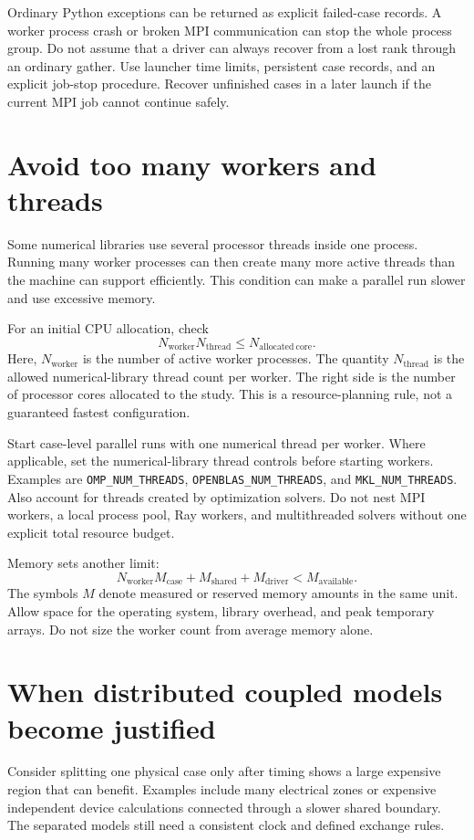 \documentclass[11pt,a4paper]{report}
\begin{document}
Ordinary Python exceptions can be returned as explicit failed-case records.
A worker process crash or broken MPI communication can stop the whole process group.
Do not assume that a driver can always recover from a lost rank through an ordinary gather.
Use launcher time limits, persistent case records, and an explicit job-stop procedure.
Recover unfinished cases in a later launch if the current MPI job cannot continue safely.

\section{Avoid too many workers and threads}
Some numerical libraries use several processor threads inside one process.
Running many worker processes can then create many more active threads than the machine can support efficiently.
This condition can make a parallel run slower and use excessive memory.

For an initial CPU allocation, check
\begin{equation}
N_{\mathrm{worker}}N_{\mathrm{thread}}
\leq N_{\mathrm{allocated\ core}}.
\label{eq:worker-budget}
\end{equation}
Here, $N_{\mathrm{worker}}$ is the number of active worker processes.
The quantity $N_{\mathrm{thread}}$ is the allowed numerical-library thread count per worker.
The right side is the number of processor cores allocated to the study.
This is a resource-planning rule, not a guaranteed fastest configuration.

Start case-level parallel runs with one numerical thread per worker.
Where applicable, set the numerical-library thread controls before starting workers.
Examples are \texttt{OMP\_NUM\_THREADS}, \texttt{OPENBLAS\_NUM\_THREADS}, and \texttt{MKL\_NUM\_THREADS}.
Also account for threads created by optimization solvers.
Do not nest MPI workers, a local process pool, Ray workers, and multithreaded solvers without one explicit total resource budget.

Memory sets another limit:
\begin{equation}
N_{\mathrm{worker}}M_{\mathrm{case}}+M_{\mathrm{shared}}+M_{\mathrm{driver}}
< M_{\mathrm{available}}.
\label{eq:memory-budget}
\end{equation}
The symbols $M$ denote measured or reserved memory amounts in the same unit.
Allow space for the operating system, library overhead, and peak temporary arrays.
Do not size the worker count from average memory alone.

\section{When distributed coupled models become justified}
Consider splitting one physical case only after timing shows a large expensive region that can benefit.
Examples include many electrical zones or expensive independent device calculations connected through a slower shared boundary.
The separated models still need a consistent clock and defined exchange rules.
\end{document}
